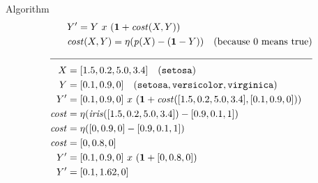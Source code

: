 \documentclass[presentation]{beamer}\mode<presentation>{\usetheme{AMSBolognaFC}}
\begin{document}
\begin{frame}[allowframebreaks]{Algorithm}
    \begin{equation*}
        \centering
        \begin{aligned}
            &Y' = Y\ x\ (\textbf{1} + \pred{cost}(X,Y))\\
            &\pred{cost}(X,Y) = \eta(\pred{p}(X) - (\textbf{1} - Y))\quad\text{(because 0 means true)}\\
            \cline{1-2}
            X &= [1.5, 0.2, 5.0, 3.4]\quad (\const{setosa})\\
            Y &= [0.1, 0.9, 0]\quad (\const{setosa},\const{versicolor},\const{virginica})\\
            Y' &= [0.1, 0.9, 0]\ x\ (\textbf{1} + \pred{cost}([1.5, 0.2, 5.0, 3.4],[0.1, 0.9, 0]))\\
            \pred{cost} &= \eta(\pred{iris}([1.5, 0.2, 5.0, 3.4]) - [0.9, 0.1, 1])\\
            \pred{cost} &= \eta([0, 0.9, 0] - [0.9, 0.1, 1])\\
            \pred{cost} &= [0, 0.8, 0]\\
            Y' &= [0.1, 0.9, 0]\ x\ (\textbf{1} + [0, 0.8, 0])\\
            Y' &= [0.1, 1.62, 0]\\
        \end{aligned}
    \end{equation*}
    
    \framebreak
    
    
\end{frame}

\section*{}

\frame{\titlepage}

\section*{\refname}

\begin{frame}{\refname}
    \scriptsize
    
    
\end{frame}

\end{document}
